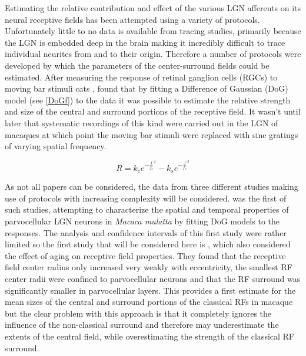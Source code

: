 Estimating the relative contribution and effect of the various LGN
afferents on its neural receptive fields has been attempted using a
variety of protocols. Unfortunately little to no data is available
from tracing studies, primarily because the LGN is embedded deep in
the brain making it incredibly difficult to trace individual neurites
from and to their origin. Therefore a number of protocols were
developed by which the parameters of the center-surround fields could
be estimated. After measuring the response of retinal ganglion cells
(RGCs) to moving bar stimuli cats \citep{Rodieck1965a,Rodieck1965b},
\cite{Rodieck1965} found that by fitting a Difference of Gaussian
(DoG) model (see \ref{DoGf}) to the data it was possible to estimate
the relative strength and size of the central and surround portions of
the receptive field. It wasn't until later that systematic recordings
of this kind were carried out in the LGN of macaques at which point
the moving bar stimuli were replaced with sine gratings of varying
spatial frequency.

\begin{equation}
R = k_c e^{-\frac{f}{f_c}^2} - k_s e^{-\frac{f}{f_s}^2}
\label{DoGf}
\end{equation}

As not all papers can be considered, the data from three different
studies making use of protocols with increasing complexity will be
considered. \cite{Derrington1984} was the first of such studies,
attempting to characterize the spatial and temporal properties of
parvocellular LGN neurons in \emph{Macaca mulatta} by fitting DoG
models to the responses. The analysis and confidence intervals of this
first study were rather limited so the first study that will be
considered here is \cite{Spear1994}, which also considered the effect
of aging on receptive field properties. They found that the receptive
field center radius only increased very weakly with eccentricity, the
smallest RF center radii were confined to parvocellular neurons and
that the RF surround was significantly smaller in parvocellular
layers. This provides a first estimate for the mean sizes of the
central and surround portions of the classical RFs in macaque but the
clear problem with this approach is that it completely ignores the
influence of the non-classical surround and therefore may
underestimate the extents of the central field, while overestimating
the strength of the classical RF surround.

